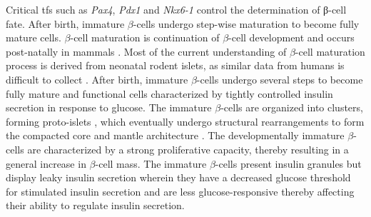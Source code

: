 Critical \glspl{tf} such as \textit{Pax4}, \textit{Pdx1} and \textit{Nkx6-1} control the determination of β-cell fate. %
 After birth, immature $\beta$-cells undergo step-wise maturation to become fully mature cells. $\beta$-cell maturation is continuation of $\beta$-cell development and occurs post-natally in mammals \textbf{\cite{barsby_maturation_2022}}. Most of the current understanding of $\beta$-cell maturation process is derived from neonatal rodent islets, as similar data from humans is difficult to collect \textbf{\cite{liu_all_2017, salinno_-cell_2019}}. After birth, immature $\beta$-cells undergo several steps to become fully mature and functional cells characterized by tightly controlled insulin secretion in response to glucose. The immature $\beta$-cells are organized into clusters, forming proto-islets \textbf{\cite{salinno_-cell_2019}}, which eventually undergo structural rearrangements to form the compacted core and mantle architecture \textbf{\cite{}}. The developmentally immature $\beta$-cells are characterized by a strong proliferative capacity, thereby resulting in a general increase in $\beta$-cell mass. The immature $\beta$-cells present insulin granules but display leaky insulin secretion wherein they have a decreased glucose threshold for stimulated insulin secretion \textbf{\cite{liu_all_2017, blum_functional_2012}} and are less glucose-responsive thereby affecting their ability to regulate insulin secretion.\\%


